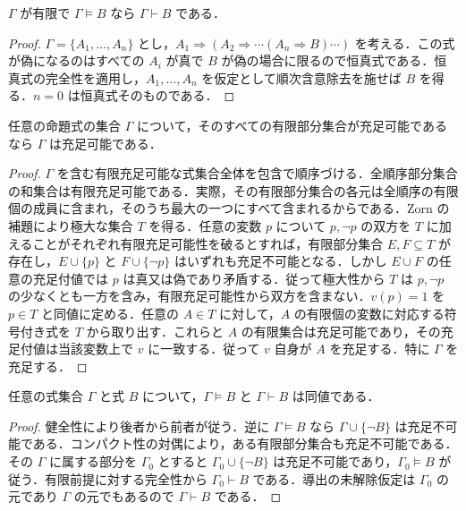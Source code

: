 \begin{prop}[有限前提に対する完全性]
$\Gamma$ が有限で $\Gamma\models B$ なら $\Gamma\vdash B$ である．
\end{prop}
\begin{proof}
$\Gamma=\{A_1,\ldots,A_n\}$ とし，$A_1\Rightarrow(A_2\Rightarrow\cdots(A_n\Rightarrow B)\cdots)$ を考える．この式が偽になるのはすべての $A_i$ が真で $B$ が偽の場合に限るので恒真式である．恒真式の完全性を適用し，$A_1,\ldots,A_n$ を仮定として順次含意除去を施せば $B$ を得る．$n=0$ は恒真式そのものである．
\end{proof}
\begin{prop}[命題論理のコンパクト性]
任意の命題式の集合 $\Gamma$ について，そのすべての有限部分集合が充足可能であるなら $\Gamma$ は充足可能である．
\end{prop}
\begin{proof}
$\Gamma$ を含む有限充足可能な式集合全体を包含で順序づける．全順序部分集合の和集合は有限充足可能である．実際，その有限部分集合の各元は全順序の有限個の成員に含まれ，そのうち最大の一つにすべて含まれるからである．Zorn の補題により極大な集合 $T$ を得る．任意の変数 $p$ について $p,\neg p$ の双方を $T$ に加えることがそれぞれ有限充足可能性を破るとすれば，有限部分集合 $E,F\subseteq T$ が存在し，$E\cup\{p\}$ と $F\cup\{\neg p\}$ はいずれも充足不可能となる．しかし $E\cup F$ の任意の充足付値では $p$ は真又は偽であり矛盾する．従って極大性から $T$ は $p,\neg p$ の少なくとも一方を含み，有限充足可能性から双方を含まない．$v(p)=1$ を $p\in T$ と同値に定める．任意の $A\in T$ に対して，$A$ の有限個の変数に対応する符号付き式を $T$ から取り出す．これらと $A$ の有限集合は充足可能であり，その充足付値は当該変数上で $v$ に一致する．従って $v$ 自身が $A$ を充足する．特に $\Gamma$ を充足する．
\end{proof}
\begin{prop}[命題論理の完全性]
任意の式集合 $\Gamma$ と式 $B$ について，$\Gamma\models B$ と $\Gamma\vdash B$ は同値である．
\end{prop}
\begin{proof}
健全性により後者から前者が従う．逆に $\Gamma\models B$ なら $\Gamma\cup\{\neg B\}$ は充足不可能である．コンパクト性の対偶により，ある有限部分集合も充足不可能である．その $\Gamma$ に属する部分を $\Gamma_0$ とすると $\Gamma_0\cup\{\neg B\}$ は充足不可能であり，$\Gamma_0\models B$ が従う．有限前提に対する完全性から $\Gamma_0\vdash B$ である．導出の未解除仮定は $\Gamma_0$ の元であり $\Gamma$ の元でもあるので $\Gamma\vdash B$ である．
\end{proof}
